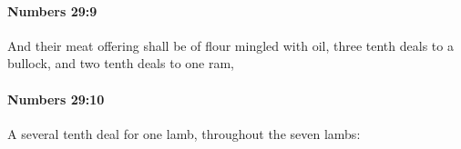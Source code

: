 		\paragraph{Numbers 29:9} %
			\label{NUMBERS-29-9}

			And their meat offering shall be of flour mingled with oil, three tenth deals to a bullock, and two tenth deals to one ram,


		\paragraph{Numbers 29:10} %
			\label{NUMBERS-29-10}

			A several tenth deal for one lamb, throughout the seven lambs:


